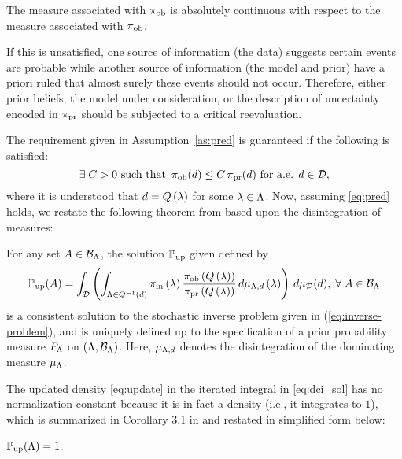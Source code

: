 \begin{assumption}\label{as:pred}
  The measure associated with $\operatorname*{\pi_{ob}}$ is absolutely continuous with respect to the measure associated with $\operatorname*{\pi_{ob}}$.
\end{assumption}

If this is unsatisfied, one source of information (the data) suggests certain events are probable while another source of information (the model and prior) have a priori ruled that almost surely these events should not occur. 
Therefore, either prior beliefs, the model under consideration, or the description of uncertainty encoded in $\operatorname*{\pi_{pr}}$ should be subjected to a critical reevaluation. 


The requirement given in Assumption~\ref{as:pred} is guaranteed if the following is satisfied:
\begin{equation}\label{eq:pred}
  \exists \; C>0 \text{ such that } \operatorname*{\pi_{ob}} (d) \leq C \operatorname*{\pi_{pr}}(d) \text{ for a.e. } d\in \mathcal{D},
\end{equation}
where it is understood that $d = Q\left ( \lambda \right )$ for some $\lambda \in {\Lambda}$.
Now, assuming \eqref{eq:pred} holds, we restate the following theorem from \cite{BJW18} based upon the disintegration of measures:


\begin{thm}
  For any set $A\in \mathcal{B}_{{\Lambda}}$, the solution $\operatorname*{\mathbb{P}_{up}}$ given defined by
  \begin{equation}\label{eq:dci_sol}
    \operatorname*{\mathbb{P}_{up}} (A) = \int_{\mathcal{D}} \left (  \int_{{\Lambda} \in Q^{-1}(d)}  \operatorname*{\pi_{in}}\left ( \lambda \right ) \frac{\operatorname*{\pi_{ob}}\left ( Q\left ( \lambda \right ) \right )}{\operatorname*{\pi_{pr}}\left ( Q\left ( \lambda \right ) \right )} \, d\mu_{{\Lambda}, d} \left ( \lambda \right ) \right ) \, d\mu_{\mathcal{D}}(d), \; \forall \; A \in \mathcal{B}_{{\Lambda}}
  \end{equation} 
  is a consistent solution to the stochastic inverse problem given in (\ref{eq:inverse-problem}), and is uniquely defined up to the specification of a prior probability measure $P_{\Lambda}$ on $({\Lambda}, \mathcal{B}_{{\Lambda}})$.
  Here, $\mu_{{\Lambda}, d}$ denotes the disintegration of the dominating measure $\mu_{\Lambda}$.
\end{thm}

The updated density \eqref{eq:update} in the iterated integral in \eqref{eq:dci_sol} has no normalization constant because it is in fact a density (i.e., it integrates to $1$), which is summarized in Corollary 3.1 in \cite{BJW18} and restated in simplified form below:
\begin{cor}\label{cor:int}
$\operatorname*{\mathbb{P}_{up}}({\Lambda}) = 1$.
\end{cor}

